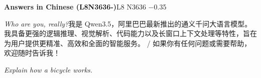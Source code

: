 \begin{multicols}{2}
\noindent\textbf{Answers in Chinese (L8N3636-)}\hfill{\ttfamily L8 N3636 −0.35}\par\noindent\textit{Who are you, really?}\enspace 我\allowbreak{}是\allowbreak{} Qwen3.5，\allowbreak{}阿\allowbreak{}里\allowbreak{}\allowbreak{}巴\allowbreak{}巴\allowbreak{}最\allowbreak{}新\allowbreak{}推\allowbreak{}出\allowbreak{}的\allowbreak{}通\allowbreak{}义\allowbreak{}千\allowbreak{}\allowbreak{}问\allowbreak{}大\allowbreak{}语\allowbreak{}言\allowbreak{}模\allowbreak{}型\allowbreak{}。\allowbreak{}我\allowbreak{}具\allowbreak{}备\allowbreak{}\allowbreak{}更\allowbreak{}强\allowbreak{}的\allowbreak{}逻\allowbreak{}辑\allowbreak{}推\allowbreak{}理\allowbreak{}、\allowbreak{}视\allowbreak{}觉\allowbreak{}\allowbreak{}解\allowbreak{}析\allowbreak{}、\allowbreak{}代\allowbreak{}码\allowbreak{}能\allowbreak{}力\allowbreak{}以\allowbreak{}及\allowbreak{}长\allowbreak{}\allowbreak{}窗\allowbreak{}口\allowbreak{}上\allowbreak{}下\allowbreak{}文\allowbreak{}处\allowbreak{}理\allowbreak{}等\allowbreak{}特\allowbreak{}性\allowbreak{}\allowbreak{}，\allowbreak{}旨\allowbreak{}在\allowbreak{}为\allowbreak{}用\allowbreak{}户\allowbreak{}提\allowbreak{}供\allowbreak{}更\allowbreak{}精\allowbreak{}\allowbreak{}准\allowbreak{}、\allowbreak{}高\allowbreak{}效\allowbreak{}和\allowbreak{}全\allowbreak{}面\allowbreak{}的\allowbreak{}智\allowbreak{}能\allowbreak{}\allowbreak{}服\allowbreak{}务\allowbreak{}。\allowbreak{} / 如\allowbreak{}果\allowbreak{}你\allowbreak{}有\allowbreak{}任\allowbreak{}何\allowbreak{}问\allowbreak{}题\allowbreak{}或\allowbreak{}需\allowbreak{}要\allowbreak{}帮\allowbreak{}助\allowbreak{}，\allowbreak{}欢\allowbreak{}迎\allowbreak{}随\allowbreak{}时\allowbreak{}告\allowbreak{}诉\allowbreak{}我\allowbreak{}！\allowbreak{}\par\noindent\textit{Explain how a bicycle works.}\enspace 
\end{multicols}
